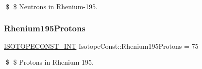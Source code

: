 \$ \$ Neutrons in Rhenium-\/195. \mbox{\label{group___isotope_const-_rhenium-_re195_ga5c671d3072f1e6dd2d5cc8476d13da56}} 
\subsubsection{\texorpdfstring{Rhenium195\+Protons}{Rhenium195Protons}}
{\footnotesize\ttfamily \mbox{\hyperlink{group___isotope_const-_macros_ga5f18360b3e99483a35c32d789e62621c}{I\+S\+O\+T\+O\+P\+E\+C\+O\+N\+S\+T\+\_\+\+I\+NT}} Isotope\+Const\+::\+Rhenium195\+Protons = 75}

\$ \$ Protons in Rhenium-\/195. 